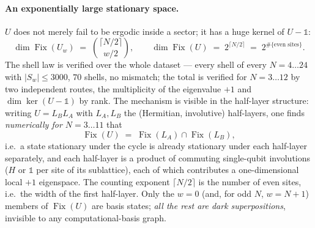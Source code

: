 \documentclass[11pt]{article}
\newcommand{\Fix}{\operatorname{Fix}}
\theoremstyle{plain}
\theoremstyle{definition}
\begin{document}
\paragraph{An exponentially large stationary space.} $U$ does not merely fail to
be ergodic inside a sector; it has a huge kernel of $U-\mathbb{1}$:
\begin{equation}
  \boxed{\;\dim\Fix(U_w) \;=\; \binom{\lceil N/2\rceil}{w/2},
  \qquad
  \dim\Fix(U) \;=\; 2^{\lceil N/2\rceil} \;=\; 2^{\#\{\text{even sites}\}} . \;}
  \label{eq:fix}
\end{equation}
The shell law is verified over the whole dataset --- every shell of every
$N=4\ldots24$ with $|S_w|\le3000$, $70$ shells, no mismatch; the total is
verified for $N=3\ldots12$ by two
independent routes, the multiplicity of the eigenvalue $+1$ and
$\dim\ker(U-\mathbb{1})$ by rank. The mechanism is visible in the half-layer
structure: writing $U = L_BL_A$ with $L_A,L_B$ the (Hermitian, involutive)
half-layers, one finds \emph{numerically for $N=3\ldots11$} that
\begin{equation}
  \Fix(U) \;=\; \Fix(L_A)\cap\Fix(L_B),
\end{equation}
i.e.\ a state stationary under the cycle is already stationary under each
half-layer separately, and each half-layer is a product of commuting single-qubit
involutions ($H$ or $\mathbb{1}$ per site of its sublattice), each of which
contributes a one-dimensional local $+1$ eigenspace. The counting exponent
$\lceil N/2\rceil$ is the number of even sites, i.e.\ the width of the first
half-layer. Only the $w=0$ (and, for odd $N$, $w=N+1$) members of $\Fix(U)$ are
basis states; \emph{all the rest are dark superpositions}, invisible to any
computational-basis graph.
\end{document}
